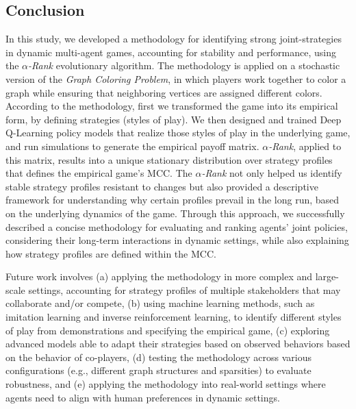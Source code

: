 \subsection{Conclusion}

    In this study, we developed a methodology for identifying strong joint-strategies in dynamic multi-agent games, accounting for stability and performance, using the \emph{$\alpha$-Rank} evolutionary algorithm. The methodology is applied on a stochastic version of the \emph{Graph Coloring Problem}, in which players work together to color a graph while ensuring that neighboring vertices are assigned different colors. According to the methodology, first we transformed the game into its empirical form, by defining strategies (styles of play). We then designed and trained Deep Q-Learning policy models that realize those styles of play in the underlying game, and run simulations to generate the empirical payoff matrix. \emph{$\alpha$-Rank}, applied to this matrix, results into a unique stationary distribution over strategy profiles that defines the empirical game's MCC. The \emph{$\alpha$-Rank} not only helped us identify stable strategy profiles resistant to changes but also provided a descriptive framework for understanding why certain profiles prevail in the long run, based on the underlying dynamics of the game. Through this approach, we successfully described a concise methodology for evaluating and ranking agents' joint policies, considering their long-term interactions in dynamic settings, while also explaining how strategy profiles are defined within the MCC.\tinydouble

    \noindent
    Future work involves (a) applying the methodology in more complex and large-scale settings, accounting for strategy profiles of multiple stakeholders that may collaborate and/or compete, (b) using machine learning methods, such as imitation learning and inverse reinforcement learning, to identify different styles of play from demonstrations and specifying the empirical game, (c) exploring advanced models able to adapt their strategies based on observed behaviors based on the behavior of co-players, (d) testing the methodology across various configurations (e.g., different graph structures and sparsities) to evaluate robustness, and (e) applying the methodology into real-world settings where agents need to align with human preferences in dynamic settings.